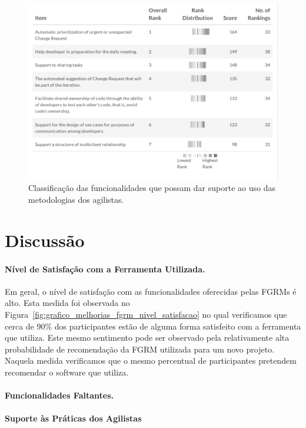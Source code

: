 \begin{figure}[htpb]
	\centering
	\includegraphics[width=0.8\linewidth]{./chapter-pesquisa-com-profissionais/img/grafico_melhorias_fgrm_suporte_particas_ageis.pdf}
	\caption{Classificação das funcionalidades que possam dar suporte ao uso das
	metodologias dos agilistas.}
\label{fig:grafico_melhorias_fgrm_suporte_particas_ageis}
\end{figure}

\section{Discussão}

\paragraph{Nível de Satisfação com a Ferramenta Utilizada.}
\label{par:pesq_profissionais_nivel_de_satisfação}

Em geral, o nível de satisfação com as funcionalidades oferecidas pelas FGRMs é
alto. Esta medida foi observada no
Figura~\ref{fig:grafico_melhorias_fgrm_nivel_satisfacao} no qual verificamos que
cerca de 90\% dos participantes estão de alguma forma satisfeito com a
ferramenta que utiliza. Este mesmo sentimento pode ser observado pela
relativamente alta probabilidade de recomendação da FGRM utilizada para um novo
projeto. Naquela medida verificamos que o mesmo percentual de participantes
pretendem recomendar o software que utiliza.

\paragraph{Funcionalidades Faltantes.}
\label{par:pesq_profissionais_funcionalidades_faltantes}

\paragraph{Suporte às Práticas dos Agilistas}
\label{par:pesq_profissionais_suporte_pratica_agilistas}

